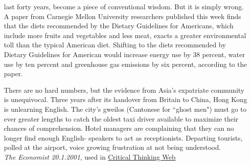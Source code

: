 \begin{earg}
	last forty years, become a piece of conventional wisdom. But it is simply
	wrong. A paper from Carnegie Mellon University researchers published
	this week finds that the diets recommended by the Dietary Guidelines for
	Americans, which include more fruits and vegetables and less meat, exacts
	a greater environmental toll than the typical American diet. Shifting to
	the diets recommended by Dietary Guidelines for American would increase
	energy use by 38 percent, water use by ten percent and greenhouse gas
	emissions by six percent, according to the paper.
	\item There are no hard numbers, but the evidence from Asia's expatriate community is unequivocal. Three years after its handover from Britain to China, Hong Kong is unlearning English. The city's gweilos (Cantonese for ``ghost men") must go to ever greater lengths to catch the oldest taxi driver available to maximize their chances of comprehension. Hotel managers are complaining that they can no longer find enough English- speakers to act as receptionists. Departing tourists, polled at the airport, voice growing frustration at not being understood. \\ \emph{The Economist 20.1.2001}, used in \href{https://philosophy.hku.hk/think/arg/arg.php}{Critical Thinking Web}
\end{earg}

